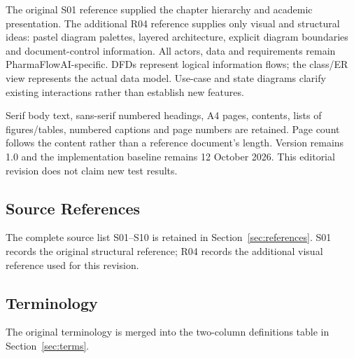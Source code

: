 \documentclass{article}
\begin{document}
The original S01 reference supplied the chapter hierarchy and academic presentation. The additional R04 reference supplies only visual and structural ideas: pastel diagram palettes, layered architecture, explicit diagram boundaries and document-control information. All actors, data and requirements remain PharmaFlowAI-specific. DFDs represent logical information flows; the class/ER view represents the actual data model. Use-case and state diagrams clarify existing interactions rather than establish new features.

Serif body text, sans-serif numbered headings, A4 pages, contents, lists of figures/tables, numbered captions and page numbers are retained. Page count follows the content rather than a reference document's length. Version remains 1.0 and the implementation baseline remains 12 October 2026. This editorial revision does not claim new test results.

\subsection{Source References}
The complete source list S01--S10 is retained in Section~\ref{sec:references}. S01 records the original structural reference; R04 records the additional visual reference used for this revision.

\subsection{Terminology}
The original terminology is merged into the two-column definitions table in Section~\ref{sec:terms}.
\clearpage
\end{document}
